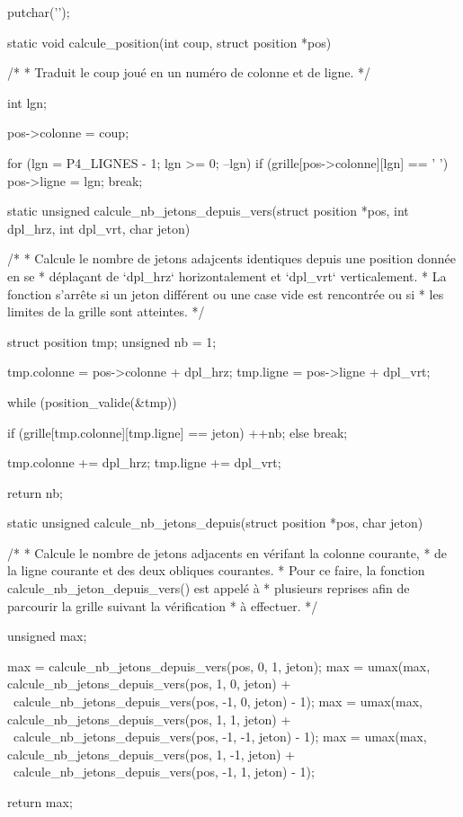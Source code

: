 \begin{C}
{    putchar('\n');
}


static void calcule_position(int coup, struct position *pos)
{
    /*
     * Traduit le coup joué en un numéro de colonne et de ligne.
     */

    int lgn;

    pos->colonne = coup;

    for (lgn = P4_LIGNES - 1; lgn >= 0; --lgn)
        if (grille[pos->colonne][lgn] == ' ')
        {
            pos->ligne = lgn;
            break;
        }
}


static unsigned calcule_nb_jetons_depuis_vers(struct position *pos, int dpl_hrz, int dpl_vrt, char jeton)
{
    /*
     * Calcule le nombre de jetons adajcents identiques depuis une position donnée en se
     * déplaçant de `dpl_hrz` horizontalement et `dpl_vrt` verticalement.
     * La fonction s'arrête si un jeton différent ou une case vide est rencontrée ou si
     * les limites de la grille sont atteintes.
     */

    struct position tmp;
    unsigned nb = 1;

    tmp.colonne = pos->colonne + dpl_hrz;
    tmp.ligne = pos->ligne + dpl_vrt;

    while (position_valide(&tmp))
    {
        if (grille[tmp.colonne][tmp.ligne] == jeton)
            ++nb;
        else
            break;

        tmp.colonne += dpl_hrz;
        tmp.ligne += dpl_vrt;
    }

    return nb;
}


static unsigned calcule_nb_jetons_depuis(struct position *pos, char jeton)
{
    /*
     * Calcule le nombre de jetons adjacents en vérifant la colonne courante,
     * de la ligne courante et des deux obliques courantes.
     * Pour ce faire, la fonction calcule_nb_jeton_depuis_vers() est appelé à
     * plusieurs reprises afin de parcourir la grille suivant la vérification
     * à effectuer.
     */

    unsigned max;

    max = calcule_nb_jetons_depuis_vers(pos, 0, 1, jeton);
    max = umax(max, calcule_nb_jetons_depuis_vers(pos, 1, 0, jeton) + \
    calcule_nb_jetons_depuis_vers(pos, -1, 0, jeton) - 1);
    max = umax(max, calcule_nb_jetons_depuis_vers(pos, 1, 1, jeton) + \
    calcule_nb_jetons_depuis_vers(pos, -1, -1, jeton) - 1);
    max = umax(max, calcule_nb_jetons_depuis_vers(pos, 1, -1, jeton) + \
    calcule_nb_jetons_depuis_vers(pos, -1, 1, jeton) - 1);

    return max;
}



\end{C}
